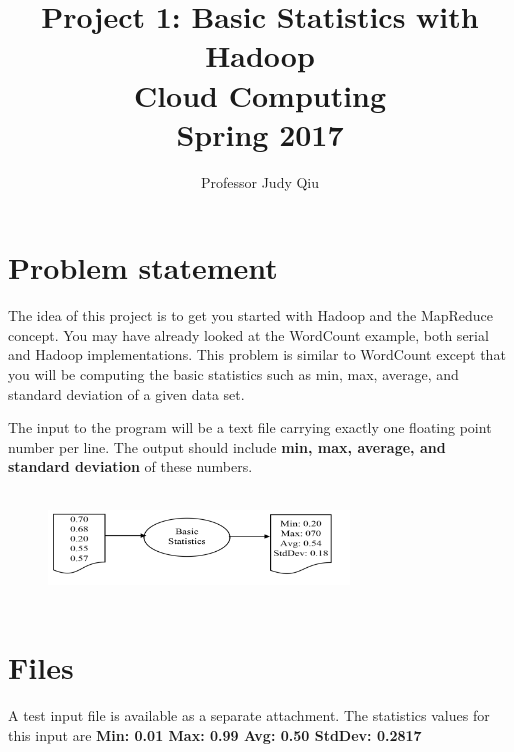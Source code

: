 \documentclass{article}
\begin{document}
\title{Project 1: Basic Statistics with Hadoop\\ Cloud Computing\\ Spring 2017}         %
\author{Professor Judy Qiu }        %
\date{}
\maketitle
\makeatother     %
\pagestyle{plain}
\section*{Problem statement}
 
The idea of this project is to get you started with Hadoop and the MapReduce concept. You may have already looked at the WordCount example, both serial and Hadoop implementations. This problem is similar to WordCount except that you will be computing the basic statistics such as min, max, average, and standard deviation of a given data set.

The input to the program will be a text file carrying exactly one floating point number per line. The output should include \textbf{min, max, average, and standard deviation} of these numbers.

\begin{figure}[!htbp]
\includegraphics[width=8cm,height=3cm]{p1example}
\centering
\end{figure}

\section*{Files}
A test input file is available as a separate attachment.
The statistics values for this input are \textbf{Min: 0.01 Max: 0.99 Avg: 0.50 StdDev: 0.2817}
\end{document}
